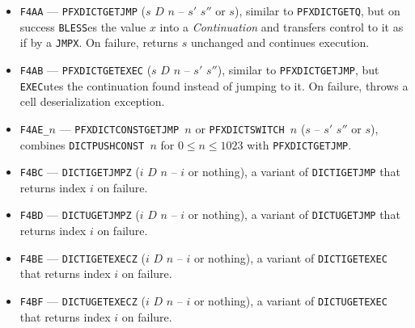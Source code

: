 \documentclass[12pt,oneside]{article}
\begin{document}
\begin{itemize}
\item {\tt F4AA} --- {\tt PFXDICTGETJMP} ($s$ $D$ $n$ -- $s'$ $s''$ or $s$), similar to {\tt PFXDICTGETQ}, but on success {\tt BLESS}es the value $x$ into a {\em Continuation\/} and transfers control to it as if by a {\tt JMPX}. On failure, returns $s$ unchanged and continues execution.
\item {\tt F4AB} --- {\tt PFXDICTGETEXEC} ($s$ $D$ $n$ -- $s'$ $s''$), similar to {\tt PFXDICTGETJMP}, but {\tt EXEC}utes the continuation found instead of jumping to it. On failure, throws a cell deserialization exception.
\item {\tt F4AE\_$n$} --- {\tt PFXDICTCONSTGETJMP $n$} or {\tt PFXDICTSWITCH $n$} ($s$ -- $s'$ $s''$ or $s$), combines {\tt DICTPUSHCONST $n$} for $0\leq n\leq 1023$ with {\tt PFXDICTGETJMP}.
\item {\tt F4BC} --- {\tt DICTIGETJMPZ} ($i$ $D$ $n$ -- $i$ or nothing), a variant of {\tt DICTIGETJMP} that returns index $i$ on failure.
\item {\tt F4BD} --- {\tt DICTUGETJMPZ} ($i$ $D$ $n$ -- $i$ or nothing), a variant of {\tt DICTUGETJMP} that returns index $i$ on failure.
\item {\tt F4BE} --- {\tt DICTIGETEXECZ} ($i$ $D$ $n$ -- $i$ or nothing), a variant of {\tt DICTIGETEXEC} that returns index $i$ on failure.
\item {\tt F4BF} --- {\tt DICTUGETEXECZ} ($i$ $D$ $n$ -- $i$ or nothing), a variant of {\tt DICTUGETEXEC} that returns index $i$ on failure.
\end{itemize}
\end{document}
